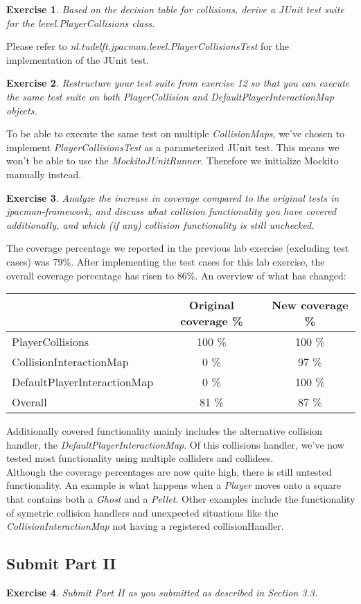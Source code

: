 \documentclass[a4paper]{article}
\newtheorem{thm}{Exercise}
\begin{document}
    \begin{thm}
      Based on the decision table for collisions, derive a JUnit test suite for the
      level.PlayerCollisions class.
    \end{thm}
    Please refer to \textit{nl.tudelft.jpacman.level.PlayerCollisionsTest} for the implementation of the JUnit test.

    \begin{thm}
      Restructure your test suite from exercise 12 so that you can execute the same test
      suite on both PlayerCollision and DefaultPlayerInteractionMap objects.
    \end{thm}
    To be able to execute the same test on multiple \textit{CollisionMaps}, we've chosen to implement \textit{PlayerCollisionsTest} as a parameterized JUnit test.
    This means we won't be able to use the \textit{MockitoJUnitRunner}. Therefore we initialize Mockito manually instead.
    
    \newpage
    \begin{thm}
      Analyze the increase in coverage compared to the original tests in jpacman-framework,
      and discuss what collision functionality you have covered additionally,
      and which (if any) collision functionality is still unchecked.
    \end{thm}
    The coverage percentage we reported in the previous lab exercise (excluding test cases) was 79\%.
    After implementing the test cases for this lab exercise, the overall coverage percentage has risen to 86\%.
    An overview of what has changed:
    \begin{table}[h]
      \begin{tabular}{|l|c|c|}
        \cline{2-3}
        \multicolumn{1}{l|}{}		& Original coverage \%	& New coverage \%	\\ \hline
        PlayerCollisions		& 100 \%		& 100 \%		\\ \hline
        CollisionInteractionMap		& 0 \%			& 97 \%			\\ \hline
        DefaultPlayerInteractionMap	& 0 \%			& 100 \%		\\ \hline
        Overall				& 81 \%			& 87 \%			\\ \hline
      \end{tabular}
    \end{table}
    Additionally covered functionality mainly includes the alternative collision handler, the \textit{DefaultPlayerInteractionMap}.
    Of this collisions handler, we've now tested most functionality using multiple colliders and collidees. \\
    Although the coverage percentages are now quite high, there is still untested functionality.
    An example is what happens when a \textit{Player} moves onto a square that contains both a \textit{Ghost} and a \textit{Pellet}.
    Other examples include the functionality of symetric collision handlers and unexpected situations
    like the \textit{CollisionInteractionMap} not having a registered collisionHandler.
  
  \subsection{Submit Part II}
    \begin{thm}
      Submit Part II as you submitted as described in Section 3.3.
    \end{thm}
\end{document}
